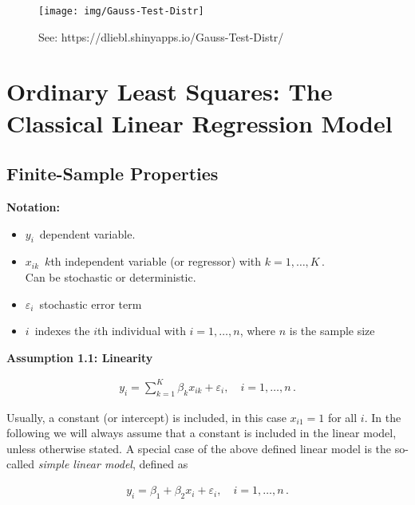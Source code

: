 \documentclass[
]{book}
\begin{document}
\begin{figure}

{\centering \texttt{[image: img/Gauss-Test-Distr]} 

}

\caption{See: https://dliebl.shinyapps.io/Gauss-Test-Distr/}\label{fig:unnamed-chunk-10}
\end{figure}

\hypertarget{ordinary-least-squares-the-classical-linear-regression-model}{%
\chapter{Ordinary Least Squares: The Classical Linear Regression Model}\label{ordinary-least-squares-the-classical-linear-regression-model}}

\hypertarget{finite-sample-properties}{%
\section{Finite-Sample Properties}\label{finite-sample-properties}}

\textbf{Notation:}

\begin{itemize}
\item
  \(y_i \,\) dependent variable.
\item
  \(x_{ik} \,\) \(k\)th independent variable (or regressor) with
  \(k=1,\dots,K \,\).\\
  Can be stochastic or deterministic.
\item
  \(\varepsilon_i \,\) stochastic error term
\item
  \(i \,\) indexes the \(i\)th individual with \(i=1,\dots,n\), where \(n\) is
  the sample size
\end{itemize}

\textbf{Assumption 1.1: Linearity}

\begin{align}
y_i = \sum_{k=1}^K\beta_k x_{ik}+\varepsilon_i, \quad i=1,\dots,n \,.
\label{eq:c3e1}
\end{align}

Usually, a constant (or intercept) is included, in this case \(x_{i1}=1\) for all \(i\). In the following we will always assume that a constant is included in the linear model, unless otherwise stated. A special case of the above defined linear model is the so-called \emph{simple linear model}, defined as

\begin{align*}
y_i = \beta_1+\beta_2 x_i +\varepsilon_i, \quad i=1,\dots,n \,.
\end{align*}
\end{document}
